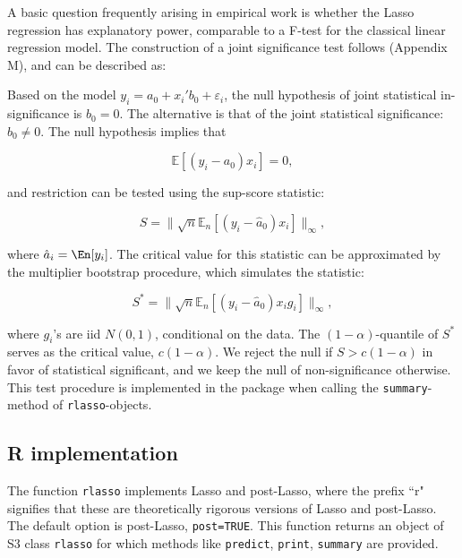 \documentclass{amsart}\usepackage[]{graphicx}\usepackage[]{color}
\newcommand{\code}[1]{\texttt{#1}}
\begin{document}
A basic question frequently arising in empirical work is whether the Lasso regression has explanatory power, comparable to a F-test for the classical linear regression model. The construction of a joint significance test follows \citep{CCK:AOS13} (Appendix M), and can be described as: 

Based on the model $ y_i =a_0 + x_i' b_0 + \varepsilon_i$, the null hypothesis of joint statistical in-significance is  $b_0 = 0$. The alternative is that of the joint statistical significance: $b_0 \neq 0$. The null hypothesis implies that
 
$$ \mathbb{E} \left[ (y_i - a_0) x_i \right] = 0,$$
 
and restriction can be tested using the sup-score statistic:
 
$$S = \| \sqrt{n} \mathbb{E}_n \left[ (y_i - \hat a_0) x_i \right] \|_\infty,$$

where $\hat a_i = \En [y_i]$.  The critical value for this statistic can be approximated  by the multiplier bootstrap procedure, which simulates the statistic:
 
$$ S^* = \| \sqrt{n} \mathbb{E}_n \left[ (y_i - \hat a_0) x_i g_i \right] \|_\infty,$$
 
where $g_i$'s are iid $N(0,1)$, conditional on the data. The $(1-\alpha)$-quantile of $S^*$ serves as the critical value, $c(1-\alpha)$. We reject the null if $S > c(1-\alpha)$ in favor of statistical significant, and we keep the null of non-significance otherwise. This test procedure is implemented in the package when calling the \texttt{summary}-method of \texttt{rlasso}-objects.


\subsection*{R implementation}  The function \texttt{rlasso} implements Lasso and post-Lasso, where the prefix ``r" signifies that these are theoretically rigorous versions of Lasso and post-Lasso. The default option is post-Lasso, \code{post=TRUE}.  This function returns an object of S3 class \code{rlasso} for which methods like \code{predict}, \code{print}, \code{summary} are provided.
\end{document}
